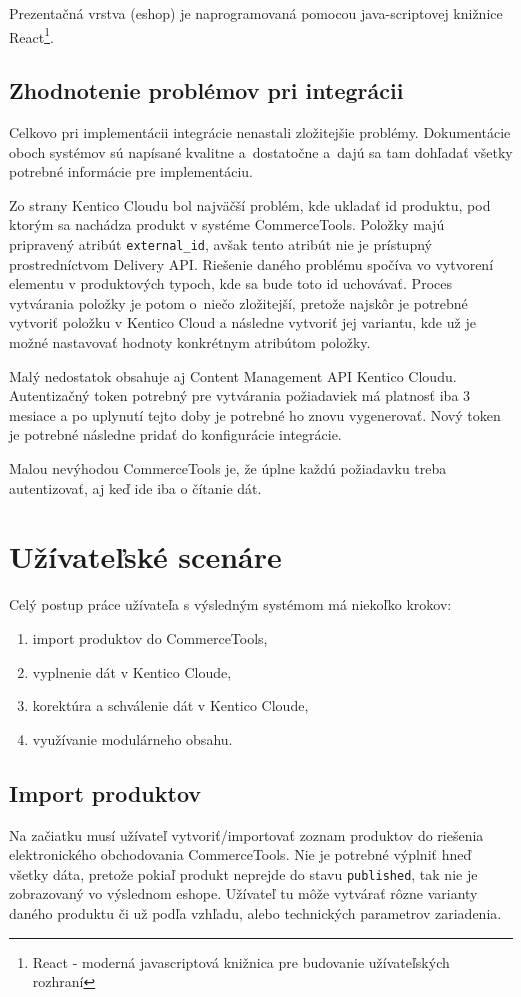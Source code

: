 \documentclass[
  printed, %
  table,   %
  lof,     %
  nolot,     %
  twoside,  
]{fithesis3}
\begin{document}
Prezentačná vrstva (eshop) je naprogramovaná pomocou java-scriptovej knižnice React\footnote{React - moderná javascriptová knižnica pre budovanie užívateľských rozhraní}.


\section{Zhodnotenie problémov pri integrácii}
Celkovo pri implementácii integrácie nenastali zložitejšie problémy. Dokumentácie oboch systémov sú napísané kvalitne a~dostatočne a~dajú sa tam dohľadať všetky potrebné informácie pre implementáciu.

Zo strany Kentico Cloudu bol najväčší problém, kde ukladať id produktu, pod ktorým sa nachádza produkt v systéme CommerceTools. Položky majú pripravený atribút \texttt{external\_id}, avšak tento atribút nie je prístupný prostredníctvom Delivery API. Riešenie daného problému spočíva vo vytvorení elementu v produktových typoch, kde sa bude toto id uchovávať. Proces vytvárania položky je potom o~niečo zložitejší, pretože najskôr je potrebné vytvoriť položku v Kentico Cloud a následne vytvoriť jej variantu, kde už je možné nastavovať hodnoty konkrétnym atribútom položky.

Malý nedostatok obsahuje aj Content Management API Kentico Cloudu. Autentizačný token potrebný pre vytvárania požiadaviek má platnosť iba 3 mesiace a po uplynutí tejto doby je potrebné ho znovu vygenerovať. Nový token je potrebné následne pridať do konfigurácie integrácie.

Malou nevýhodou CommerceTools je, že úplne každú požiadavku treba autentizovať, aj keď ide iba o čítanie dát.

\chapter{Užívateľské scenáre}
Celý postup práce užívateľa s výsledným systémom má niekoľko krokov:
\begin{enumerate}
	\item import produktov do CommerceTools,
	\item vyplnenie dát v Kentico Cloude,
	\item korektúra a schválenie dát v Kentico Cloude,
	\item využívanie modulárneho obsahu.
\end{enumerate}

\section{Import produktov}
Na začiatku musí užívateľ vytvoriť/importovať zoznam produktov do riešenia elektronického obchodovania CommerceTools. Nie je potrebné výplniť hneď všetky dáta, pretože pokiaľ produkt neprejde do stavu \texttt{published}, tak nie je zobrazovaný vo výslednom eshope. Užívateľ tu môže vytvárať rôzne varianty daného produktu či už podľa vzhľadu, alebo technických parametrov zariadenia.
\end{document}
